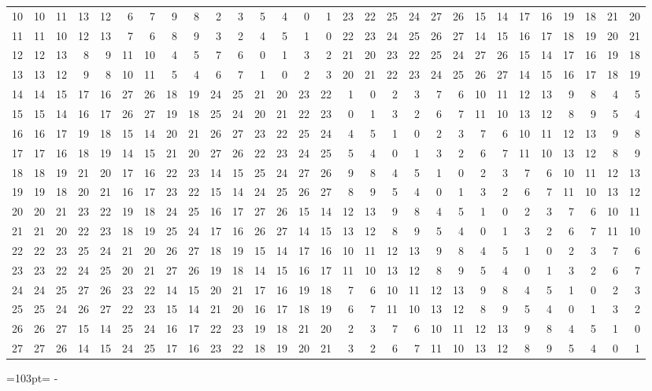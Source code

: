 \documentclass[10pt,a4paper]{article}
\newcommand{\needspace}[1]{\par\penalty-100\begingroup\dimen0=#1\relax\dimen2=\pagegoal
  \advance\dimen2-\pagetotal\ifdim\dimen0>\dimen2\relax\ifdim\dimen2>0pt\vfil\break\fi\fi
  \endgroup}
\numberwithin{equation}{section}
\begin{document}
{\begin{longtable}{@{}r|rrrrrrrrrrrrrrrrrrrrrrrrrrrr@{}}
10 & 10 & 11 & 13 & 12 & 6 & 7 & 9 & 8 & 2 & 3 & 5 & 4 & 0 & 1 & 23 & 22 & 25 & 24 & 27 & 26 & 15 & 14 & 17 & 16 & 19 & 18 & 21 & 20\\
11 & 11 & 10 & 12 & 13 & 7 & 6 & 8 & 9 & 3 & 2 & 4 & 5 & 1 & 0 & 22 & 23 & 24 & 25 & 26 & 27 & 14 & 15 & 16 & 17 & 18 & 19 & 20 & 21\\
12 & 12 & 13 & 8 & 9 & 11 & 10 & 4 & 5 & 7 & 6 & 0 & 1 & 3 & 2 & 21 & 20 & 23 & 22 & 25 & 24 & 27 & 26 & 15 & 14 & 17 & 16 & 19 & 18\\
13 & 13 & 12 & 9 & 8 & 10 & 11 & 5 & 4 & 6 & 7 & 1 & 0 & 2 & 3 & 20 & 21 & 22 & 23 & 24 & 25 & 26 & 27 & 14 & 15 & 16 & 17 & 18 & 19\\
14 & 14 & 15 & 17 & 16 & 27 & 26 & 18 & 19 & 24 & 25 & 21 & 20 & 23 & 22 & 1 & 0 & 2 & 3 & 7 & 6 & 10 & 11 & 12 & 13 & 9 & 8 & 4 & 5\\
15 & 15 & 14 & 16 & 17 & 26 & 27 & 19 & 18 & 25 & 24 & 20 & 21 & 22 & 23 & 0 & 1 & 3 & 2 & 6 & 7 & 11 & 10 & 13 & 12 & 8 & 9 & 5 & 4\\
16 & 16 & 17 & 19 & 18 & 15 & 14 & 20 & 21 & 26 & 27 & 23 & 22 & 25 & 24 & 4 & 5 & 1 & 0 & 2 & 3 & 7 & 6 & 10 & 11 & 12 & 13 & 9 & 8\\
17 & 17 & 16 & 18 & 19 & 14 & 15 & 21 & 20 & 27 & 26 & 22 & 23 & 24 & 25 & 5 & 4 & 0 & 1 & 3 & 2 & 6 & 7 & 11 & 10 & 13 & 12 & 8 & 9\\
18 & 18 & 19 & 21 & 20 & 17 & 16 & 22 & 23 & 14 & 15 & 25 & 24 & 27 & 26 & 9 & 8 & 4 & 5 & 1 & 0 & 2 & 3 & 7 & 6 & 10 & 11 & 12 & 13\\
19 & 19 & 18 & 20 & 21 & 16 & 17 & 23 & 22 & 15 & 14 & 24 & 25 & 26 & 27 & 8 & 9 & 5 & 4 & 0 & 1 & 3 & 2 & 6 & 7 & 11 & 10 & 13 & 12\\
20 & 20 & 21 & 23 & 22 & 19 & 18 & 24 & 25 & 16 & 17 & 27 & 26 & 15 & 14 & 12 & 13 & 9 & 8 & 4 & 5 & 1 & 0 & 2 & 3 & 7 & 6 & 10 & 11\\
21 & 21 & 20 & 22 & 23 & 18 & 19 & 25 & 24 & 17 & 16 & 26 & 27 & 14 & 15 & 13 & 12 & 8 & 9 & 5 & 4 & 0 & 1 & 3 & 2 & 6 & 7 & 11 & 10\\
22 & 22 & 23 & 25 & 24 & 21 & 20 & 26 & 27 & 18 & 19 & 15 & 14 & 17 & 16 & 10 & 11 & 12 & 13 & 9 & 8 & 4 & 5 & 1 & 0 & 2 & 3 & 7 & 6\\
23 & 23 & 22 & 24 & 25 & 20 & 21 & 27 & 26 & 19 & 18 & 14 & 15 & 16 & 17 & 11 & 10 & 13 & 12 & 8 & 9 & 5 & 4 & 0 & 1 & 3 & 2 & 6 & 7\\
24 & 24 & 25 & 27 & 26 & 23 & 22 & 14 & 15 & 20 & 21 & 17 & 16 & 19 & 18 & 7 & 6 & 10 & 11 & 12 & 13 & 9 & 8 & 4 & 5 & 1 & 0 & 2 & 3\\
25 & 25 & 24 & 26 & 27 & 22 & 23 & 15 & 14 & 21 & 20 & 16 & 17 & 18 & 19 & 6 & 7 & 11 & 10 & 13 & 12 & 8 & 9 & 5 & 4 & 0 & 1 & 3 & 2\\
26 & 26 & 27 & 15 & 14 & 25 & 24 & 16 & 17 & 22 & 23 & 19 & 18 & 21 & 20 & 2 & 3 & 7 & 6 & 10 & 11 & 12 & 13 & 9 & 8 & 4 & 5 & 1 & 0\\*
27 & 27 & 26 & 14 & 15 & 24 & 25 & 17 & 16 & 23 & 22 & 18 & 19 & 20 & 21 & 3 & 2 & 6 & 7 & 11 & 10 & 13 & 12 & 8 & 9 & 5 & 4 & 0 & 1\\
\bottomrule\end{longtable}}
\needspace{103pt}
\end{document}
